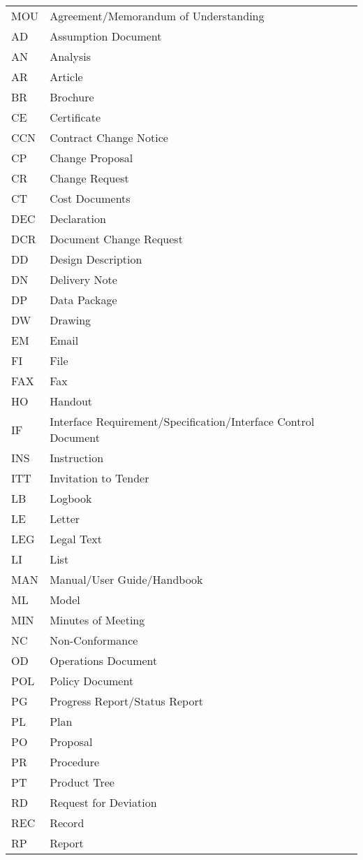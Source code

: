 \begin{tabular}{l l}
MOU & Agreement/Memorandum of Understanding \\
AD & Assumption Document \\
AN & Analysis \\
AR & Article \\
BR & Brochure \\
CE & Certificate \\
CCN & Contract Change Notice \\
CP & Change Proposal \\
CR & Change Request \\
CT & Cost Documents \\
DEC & Declaration \\
DCR & Document Change Request \\
DD & Design Description \\
DN & Delivery Note \\
DP & Data Package \\
DW & Drawing \\
EM & Email \\
FI & File \\
FAX & Fax \\
HO & Handout \\
IF & Interface Requirement/Specification/Interface Control Document \\
INS & Instruction \\
ITT & Invitation to Tender \\
LB & Logbook \\
LE & Letter \\
LEG & Legal Text \\
LI & List \\
MAN & Manual/User Guide/Handbook \\
ML & Model \\
MIN & Minutes of Meeting \\
NC & Non-Conformance \\
OD & Operations Document \\
POL & Policy Document \\
PG & Progress Report/Status Report \\
PL & Plan \\
PO & Proposal \\
PR & Procedure \\
PT & Product Tree \\
RD & Request for Deviation \\
REC & Record \\
RP & Report \\

\end{tabular}
